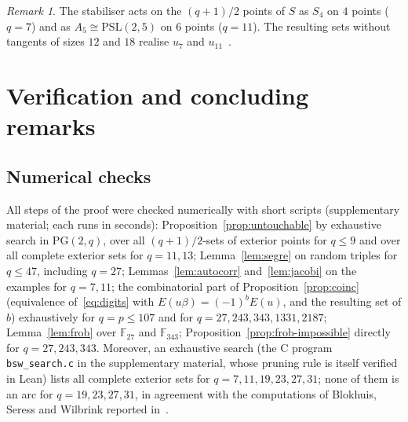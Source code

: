 \documentclass[11pt]{amsart}
\theoremstyle{definition}
\theoremstyle{remark}
\newtheorem{remark}[theorem]{Remark}
\numberwithin{equation}{section}
\newcommand{\PGtwo}{\mathrm{PG}(2,q)}
\begin{document}
\begin{remark}
The stabiliser acts on the $(q+1)/2$ points of $S$ as $S_4$ on $4$ points ($q=7$) and as $A_5\cong\mathrm{PSL}(2,5)$ on $6$ points
($q=11$). The resulting sets without tangents of sizes $12$ and $18$ realise $u_7$ and $u_{11}$~\cite{VdV,HegerNagy}.
\end{remark}

\section{Verification and concluding remarks}\label{sec:verification}

\subsection{Numerical checks}
All steps of the proof were checked numerically with short scripts (supplementary material; each runs in seconds):
Proposition~\ref{prop:untouchable} by exhaustive search in $\PGtwo$, over all $(q+1)/2$-sets of exterior points for $q\le9$
and over all complete exterior sets for $q=11,13$; Lemma~\ref{lem:segre} on random triples for
$q\le47$, including $q=27$; Lemmas~\ref{lem:autocorr} and~\ref{lem:jacobi} on the examples for $q=7,11$; the combinatorial part of
Proposition~\ref{prop:coinc} (equivalence of~\eqref{eq:digits} with $E(u\beta)=(-1)^bE(u)$, and the resulting set of $b$)
exhaustively for $q=p\le107$ and for $q=27,243,343,1331,2187$; Lemma~\ref{lem:frob} over $\mathbb F_{27}$ and $\mathbb F_{343}$;
Proposition~\ref{prop:frob-impossible} directly for $q=27,243,343$. Moreover, an exhaustive search (the C program \texttt{bsw\_search.c} in the
supplementary material, whose pruning rule is itself verified in Lean) lists all complete exterior sets for
$q=7,11,19,23,27,31$; none of them is an arc for $q=19,23,27,31$, in agreement with the computations of Blokhuis,
Seress and Wilbrink reported in~\cite[\S3]{VdV}.
\end{document}
